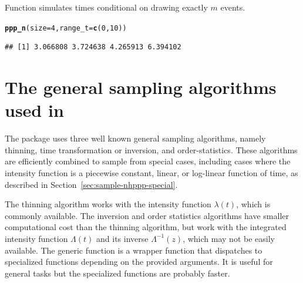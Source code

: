\documentclass[article]{jss}\usepackage[]{graphicx}\usepackage[]{xcolor}
\makeatletter
\newcommand{\hlnum}[1]{\textcolor[rgb]{0.686,0.059,0.569}{#1}}%
\newcommand{\hlstd}[1]{\textcolor[rgb]{0.345,0.345,0.345}{#1}}%
\newcommand{\hlkwc}[1]{\textcolor[rgb]{0.333,0.667,0.333}{#1}}%
\newcommand{\hlkwd}[1]{\textcolor[rgb]{0.737,0.353,0.396}{\textbf{#1}}}%
\newenvironment{kframe}{%
 \def\at@end@of@kframe{}%
 \ifinner\ifhmode%
  \def\at@end@of@kframe{\end{minipage}}%
  \begin{minipage}{\columnwidth}%
 \fi\fi%
 \def\FrameCommand##1{\hskip\@totalleftmargin \hskip-\fboxsep
 \colorbox{shadecolor}{##1}\hskip-\fboxsep
     \hskip-\linewidth \hskip-\@totalleftmargin \hskip\columnwidth}%
 \MakeFramed {\advance\hsize-\width
   \@totalleftmargin\z@ \linewidth\hsize
   \@setminipage}}%
 {\par\unskip\endMakeFramed%
 \at@end@of@kframe}
\newenvironment{knitrout}{}{} %
\newcommand{\fct}[1]{\code{#1()}}
\makeatother
\begin{document}
Function \fct{ppp\_n} simulates times conditional on drawing exactly $m$ events.
\begin{knitrout}
\color{fgcolor}\begin{kframe}
\begin{alltt}
\hlkwd{ppp_n}\hlstd{(}\hlkwc{size} \hlstd{=} \hlnum{4}\hlstd{,} \hlkwc{range_t} \hlstd{=} \hlkwd{c}\hlstd{(}\hlnum{0}\hlstd{,} \hlnum{10}\hlstd{))}
\end{alltt}
\begin{verbatim}
## [1] 3.066808 3.724638 4.265913 6.394102
\end{verbatim}
\end{kframe}
\end{knitrout}

\section[The general sampling algorithms used in nhppp]{The general sampling algorithms used in }\label{sec:general-sampling}

The  package uses three well known general sampling algorithms, namely thinning, time transformation or inversion, and order-statistics. These algorithms are efficiently combined to sample from special cases, including cases where the intensity function is a piecewise constant, linear, or log-linear function of time, as described in Section~\ref{sec:sample-nhppp-special}.

The thinning algorithm works with the intensity function $\lambda(t)$, which is commonly available. The inversion and order statistics algorithms have smaller computational cost than the thinning algorithm, but work with the integrated intensity function $\Lambda(t)$ and its inverse $\Lambda^{-1}(z)$, which may not be easily available. The generic function \fct{draw} is a wrapper function that dispatches to specialized functions depending on the provided arguments. It is useful for general tasks but the specialized functions are probably faster.
\end{document}
